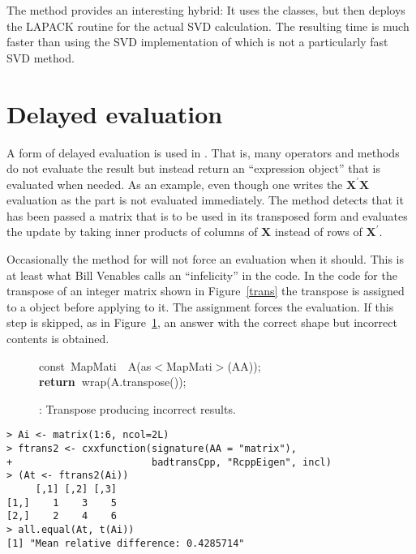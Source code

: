 \documentclass[shortnames,article,nojss]{jss}
\newcommand{\hlstd}[1]{\textcolor[rgb]{0,0,0}{#1}}
\newcommand{\hlopt}[1]{\textcolor[rgb]{0,0,0}{#1}}
\newcommand{\hlkwa}[1]{\textcolor[rgb]{0.61,0.13,0.93}{\bf{#1}}}
\newcommand{\hlkwb}[1]{\textcolor[rgb]{0.13,0.54,0.13}{#1}}
\newcommand{\hlkwd}[1]{\textcolor[rgb]{0,0,0}{#1}}
\begin{document}
The  method provides an interesting hybrid: It uses the
 classes, but then deploys the LAPACK routine  for
the actual SVD calculation. The resulting time is much faster than using the
SVD implementation of  which is not a particularly fast SVD
method.


\section{Delayed evaluation}
\label{sec:delayed}

A form of delayed evaluation is used in .  That is, many
operators and methods do not evaluate the result but instead return an
``expression object'' that is evaluated when needed.  As an example,
even though one writes the $\bm X^\prime\bm X$ evaluation as
 the  part is not
evaluated immediately.  The  method detects that it
has been passed a matrix that is to be used in its transposed form and
evaluates the update by taking inner products of columns of $\bm X$
instead of rows of $\bm X^\prime$.

Occasionally the method for  will not force an
evaluation when it should.  This is at least what Bill Venables calls
an ``infelicity'' in the code. %
In the code for the transpose of an integer matrix shown in
Figure~\ref{trans} the transpose is assigned to a  object
before applying  to it.  The assignment forces the evaluation.  If
this step is skipped, as in Figure~\ref{badtrans}, an answer with the correct
shape but incorrect contents is obtained.

\begin{figure}[htb]
  \noindent
  \ttfamily
  \hlstd{}\hlkwb{const\ }\hlstd{MapMati}\hlstd{\ \ }\hlstd{}\hlkwd{A}\hlstd{}\hlopt{(}\hlstd{as}\hlopt{$<$}\hlstd{MapMati}\hlopt{$>$(}\hlstd{AA}\hlopt{));}\hspace*{\fill}\\
  \hlstd{}\hlkwa{return\ }\hlstd{}\hlkwd{wrap}\hlstd{}\hlopt{(}\hlstd{A}\hlopt{.}\hlstd{}\hlkwd{transpose}\hlstd{}\hlopt{());}\hlstd{}\hspace*{\fill}\\
  \mbox{}
  \normalfont
  \normalsize
  \caption{: Transpose producing incorrect results.}
  \label{badtrans}
\end{figure}
\begin{verbatim}
> Ai <- matrix(1:6, ncol=2L)
> ftrans2 <- cxxfunction(signature(AA = "matrix"), 
+                        badtransCpp, "RcppEigen", incl)
> (At <- ftrans2(Ai))
     [,1] [,2] [,3]
[1,]    1    3    5
[2,]    2    4    6
> all.equal(At, t(Ai))
[1] "Mean relative difference: 0.4285714"
\end{verbatim}
\end{document}
